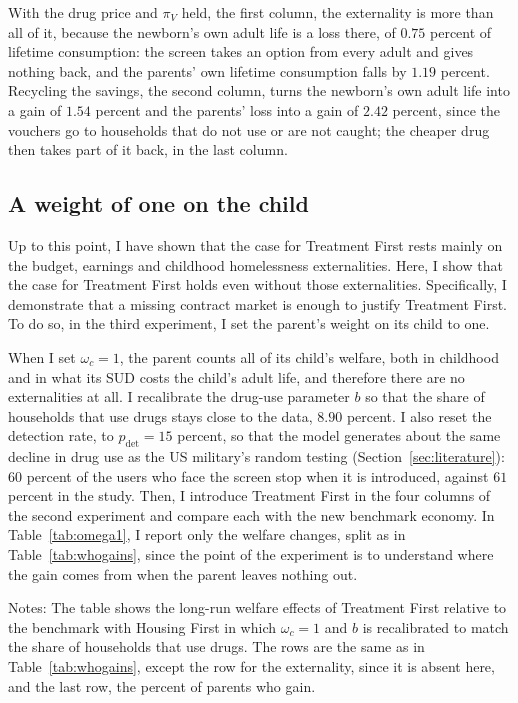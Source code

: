 \documentclass[10pt]{article}
\newcommand{\notes}[2]{\par\vspace{0.4em}%
  \begin{minipage}{#1}\footnotesize #2\end{minipage}}
\newcommand{\tabnote}[1]{\notes{\wd\ntbox}{#1}}
\begin{document}
With the drug price and $\pi_V$ held, the first column, the externality is more than all of it, because the newborn's own adult life is a loss there, of $0.75$ percent of lifetime consumption: the screen takes an option from every adult and gives nothing back, and the parents' own lifetime consumption falls by $1.19$ percent. Recycling the savings, the second column, turns the newborn's own adult life into a gain of $1.54$ percent and the parents' loss into a gain of $2.42$ percent, since the vouchers go to households that do not use or are not caught; the cheaper drug then takes part of it back, in the last column.

\subsection{A weight of one on the child}\label{sec:omega1}

Up to this point, I have shown that the case for Treatment First rests mainly on the budget, earnings and childhood homelessness externalities. Here, I show that the case for Treatment First holds even without those externalities. Specifically, I demonstrate that a missing contract market is enough to justify Treatment First. To do so, in the third experiment, I set the parent's weight on its child to one.

When I set $\omega_c=1$, the parent counts all of its child's welfare, both in childhood and in what its SUD costs the child's adult life, and therefore there are no externalities at all. I recalibrate the drug-use parameter $b$ so that the share of households that use drugs stays close to the data, $8.90$ percent. I also reset the detection rate, to $p_{\mathrm{det}}=15$ percent, so that the model generates about the same decline in drug use as the US military's random testing (Section~\ref{sec:literature}): $60$ percent of the users who face the screen stop when it is introduced, against $61$ percent in the study. Then, I introduce Treatment First in the four columns of the second experiment and compare each with the new benchmark economy. In Table~\ref{tab:omega1}, I report only the welfare changes, split as in Table~\ref{tab:whogains}, since the point of the experiment is to understand where the gain comes from when the parent leaves nothing out.

\begin{table}[!tb]\centering
\caption{A weight of one on the child: the change in welfare}\label{tab:omega1}
\begingroup\small
\sbox{\ntbox}{}\usebox{\ntbox}
\tabnote{Notes: The table shows the long-run welfare effects of Treatment First relative to the benchmark with Housing First in which $\omega_c=1$ and $b$ is recalibrated to match the share of households that use drugs. The rows are the same as in Table~\ref{tab:whogains}, except the row for the externality, since it is absent here, and the last row, the percent of parents who gain. }
\endgroup
\end{table}
\end{document}
